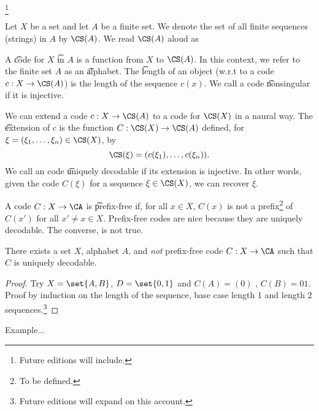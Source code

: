 
\footnote{Future editions will include.}


Let $X$ be a set and let $A$ be a finite set.
We denote the set of all finite sequences (strings) in $A$ by $\CS(A)$.
We read $\CS(A)$ aloud as 

A \t{code} for $X$ \t{in} $A$ is a function from $X$ to $\CS(A)$.
In this context, we refer to the finite set $A$ as an \t{alphabet}.
The \t{length} of an object (w.r.t to a code $c: X \to \CS(A)$) is the length of the sequence $c(x)$.
We call a code \t{nonsingular} if it is injective.



We can extend a code $c: X \to \CS(A)$ to a code for $\CS(X)$ in a naural way.
The \t{extension} of $c$ is the function $C: \CS(X) \to \CS(A)$ defined, for $\xi = (\xi_1, \dots, \xi_n) \in \CS(X)$, by
\[
  \CS(\xi) = (c(\xi_1), \dots, c(\xi_n)).
\]
We call an code \t{uniquely decodable} if its extension is injective.
In other words, given the code $C(\xi)$ for a sequence $\xi \in \CS(X)$, we can recover $\xi$.


A code $C: X \to \CA$ is \t{prefix-free} if, for all $x \in X$, $C(x)$ is not a prefix\footnote{To be defined.} of $C(x')$ for all $x' \neq x \in X$.
Prefix-free codes are nice because they are uniquely decodable.
The converse, is not true.

\begin{proposition}
  There exists a set $X$, alphabet $A$, and \textit{not} prefix-free code $C: X \to \CA$ such that $C$ is uniquely decodable.
  \begin{proof}
  Try $X = \set{A, B}$, $D = \set{0, 1}$ and $C(A) = (0)$ , $C(B) = 01$.
  Proof by induction on the length of the sequence, base case length 1 and length 2 sequences.\footnote{Future editions will expand on this account.}
  \end{proof}
\end{proposition}

Example...


\blankpage
